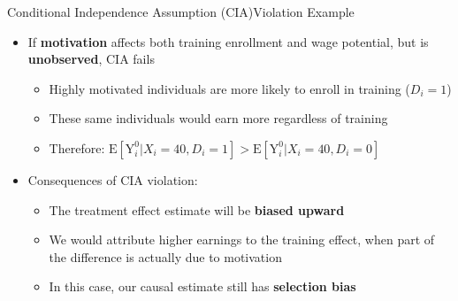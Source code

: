 \documentclass[hyperref={pdfpagelabels=false}]{beamer}
\begin{document}
\begin{frame}{Conditional Independence Assumption (CIA)}{Violation Example}
	\begin{itemize}
		\item If \textbf{motivation} affects both training enrollment and wage potential, but is \textbf{unobserved}, CIA fails
		\vspace{0.2cm}
		\begin{itemize}
			\item Highly motivated individuals are more likely to enroll in training ($D_i=1$)
			\vspace{0.2cm}
			\item These same individuals would earn more regardless of training
			\vspace{0.2cm}
			\item Therefore: $\mathrm{E}[\mathrm{Y}^{0}_{i}|X_{i}=40, D_i=1] > \mathrm{E}[\mathrm{Y}^{0}_{i}|X_{i}=40, D_i=0]$
		\end{itemize}
		\vspace{0.3cm}
		\item Consequences of CIA violation:
					\vspace{0.2cm}
		\begin{itemize}
			\item The treatment effect estimate will be \textbf{biased upward}
			\vspace{0.2cm}
			\item We would attribute higher earnings to the training effect, when part of the difference is actually due to motivation
			\vspace{0.2cm}
			\item In this case, our causal estimate still has \textbf{selection bias}
		\end{itemize}
	\end{itemize}
\end{frame}
\end{document}

